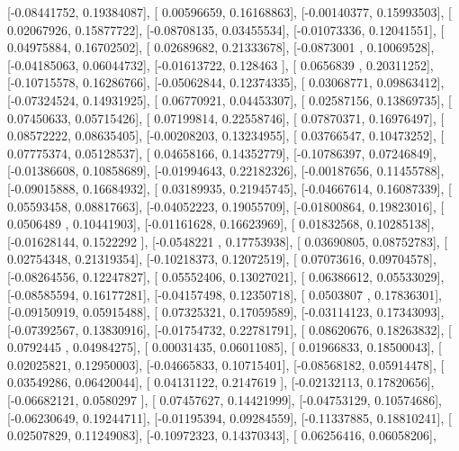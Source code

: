 \documentclass{article}
\begin{document}
       [-0.08441752,  0.19384087],
       [ 0.00596659,  0.16168863],
       [-0.00140377,  0.15993503],
       [ 0.02067926,  0.15877722],
       [-0.08708135,  0.03455534],
       [-0.01073336,  0.12041551],
       [ 0.04975884,  0.16702502],
       [ 0.02689682,  0.21333678],
       [-0.0873001 ,  0.10069528],
       [-0.04185063,  0.06044732],
       [-0.01613722,  0.128463  ],
       [ 0.0656839 ,  0.20311252],
       [-0.10715578,  0.16286766],
       [-0.05062844,  0.12374335],
       [ 0.03068771,  0.09863412],
       [-0.07324524,  0.14931925],
       [ 0.06770921,  0.04453307],
       [ 0.02587156,  0.13869735],
       [ 0.07450633,  0.05715426],
       [ 0.07199814,  0.22558746],
       [ 0.07870371,  0.16976497],
       [ 0.08572222,  0.08635405],
       [-0.00208203,  0.13234955],
       [ 0.03766547,  0.10473252],
       [ 0.07775374,  0.05128537],
       [ 0.04658166,  0.14352779],
       [-0.10786397,  0.07246849],
       [-0.01386608,  0.10858689],
       [-0.01994643,  0.22182326],
       [-0.00187656,  0.11455788],
       [-0.09015888,  0.16684932],
       [ 0.03189935,  0.21945745],
       [-0.04667614,  0.16087339],
       [ 0.05593458,  0.08817663],
       [-0.04052223,  0.19055709],
       [-0.01800864,  0.19823016],
       [ 0.0506489 ,  0.10441903],
       [-0.01161628,  0.16623969],
       [ 0.01832568,  0.10285138],
       [-0.01628144,  0.1522292 ],
       [-0.0548221 ,  0.17753938],
       [ 0.03690805,  0.08752783],
       [ 0.02754348,  0.21319354],
       [-0.10218373,  0.12072519],
       [ 0.07073616,  0.09704578],
       [-0.08264556,  0.12247827],
       [ 0.05552406,  0.13027021],
       [ 0.06386612,  0.05533029],
       [-0.08585594,  0.16177281],
       [-0.04157498,  0.12350718],
       [ 0.0503807 ,  0.17836301],
       [-0.09150919,  0.05915488],
       [ 0.07325321,  0.17059589],
       [-0.03114123,  0.17343093],
       [-0.07392567,  0.13830916],
       [-0.01754732,  0.22781791],
       [ 0.08620676,  0.18263832],
       [ 0.0792445 ,  0.04984275],
       [ 0.00031435,  0.06011085],
       [ 0.01966833,  0.18500043],
       [ 0.02025821,  0.12950003],
       [-0.04665833,  0.10715401],
       [-0.08568182,  0.05914478],
       [ 0.03549286,  0.06420044],
       [ 0.04131122,  0.2147619 ],
       [-0.02132113,  0.17820656],
       [-0.06682121,  0.0580297 ],
       [ 0.07457627,  0.14421999],
       [-0.04753129,  0.10574686],
       [-0.06230649,  0.19244711],
       [-0.01195394,  0.09284559],
       [-0.11337885,  0.18810241],
       [ 0.02507829,  0.11249083],
       [-0.10972323,  0.14370343],
       [ 0.06256416,  0.06058206],
\end{document}
